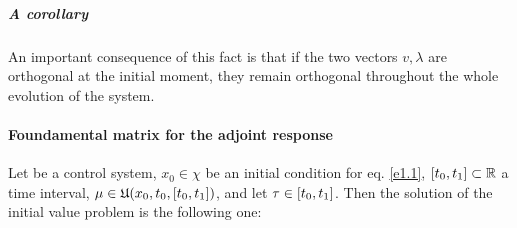 \subparagraph[4.6]{A corollary} An important consequence of this fact is that if the two vectors $v,\lambda$ are orthogonal at the initial moment, they remain orthogonal throughout the whole evolution of the system. 


\paragraph[prop 4.7]{Foundamental matrix for the adjoint response}
 Let \controlSystem be a control system, $x_0\in\chi$ be an initial condition for eq. \ref{e1.1}, $[t_0,t_1]\subset\mathbb{R}$ a time interval, $\mu\in\mathfrak{U}(x_0,t_0,[t_0,t_1])$, and let $\tau\in[t_0,t_1]$. Then the solution of the initial value problem 
is the following one:
